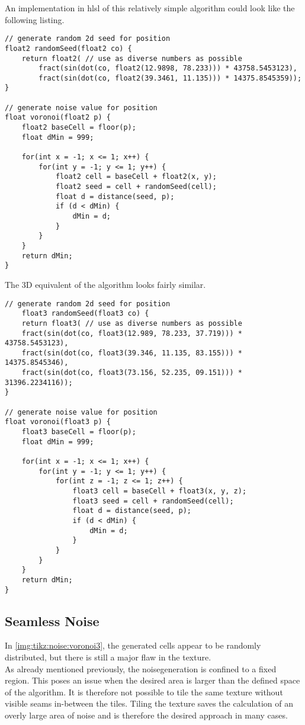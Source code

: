 \noindent
An implementation in \gls{hlsl} of this relatively simple algorithm could look like the following listing.
\begin{lstlisting}[language=HLSL, caption=Implementation of 2D Voronoi \gls{noise} algorithm., label=lst:shader:noise:voronoi2d]
// generate random 2d seed for position
float2 randomSeed(float2 co) {
    return float2( // use as diverse numbers as possible
        fract(sin(dot(co, float2(12.9898, 78.233))) * 43758.5453123),
        fract(sin(dot(co, float2(39.3461, 11.135))) * 14375.8545359));
}

// generate noise value for position
float voronoi(float2 p) {
    float2 baseCell = floor(p);
    float dMin = 999;

    for(int x = -1; x <= 1; x++) {
        for(int y = -1; y <= 1; y++) {
            float2 cell = baseCell + float2(x, y);
            float2 seed = cell + randomSeed(cell);
            float d = distance(seed, p);
            if (d < dMin) {
                dMin = d;
            }
        }
    }
    return dMin;
}
\end{lstlisting}

\noindent
The 3D equivalent of the algorithm looks fairly similar.

\begin{lstlisting}[language=HLSL, caption=Implementation of 3D Voronoi \gls{noise} algorithm., label=lst:shader:noise:voronoi3d]
    // generate random 2d seed for position
    float3 randomSeed(float3 co) {
    return float3( // use as diverse numbers as possible
    fract(sin(dot(co, float3(12.989, 78.233, 37.719))) * 43758.5453123),
    fract(sin(dot(co, float3(39.346, 11.135, 83.155))) * 14375.8545346),
    fract(sin(dot(co, float3(73.156, 52.235, 09.151))) * 31396.2234116));
}

// generate noise value for position
float voronoi(float3 p) {
    float3 baseCell = floor(p);
    float dMin = 999;

    for(int x = -1; x <= 1; x++) {
        for(int y = -1; y <= 1; y++) {
            for(int z = -1; z <= 1; z++) {
                float3 cell = baseCell + float3(x, y, z);
                float3 seed = cell + randomSeed(cell);
                float d = distance(seed, p);
                if (d < dMin) {
                    dMin = d;
                }
            }
        }
    }
    return dMin;
}
\end{lstlisting}

\subsection{Seamless Noise}
\label{section:noise:seamless}
In \autoref{img:tikz:noise:voronoi3}, the generated cells appear to be randomly distributed, but there is still a major flaw in the texture.
\\
As already mentioned previously, the \gls{noisegeneration} is confined to a fixed region.
This poses an issue when the desired area is larger than the defined space of the algorithm.
It is therefore not possible to tile the same texture without visible seams in-between the tiles.
Tiling the texture saves the calculation of an overly large area of \gls{noise} and is therefore the desired approach in many cases.

